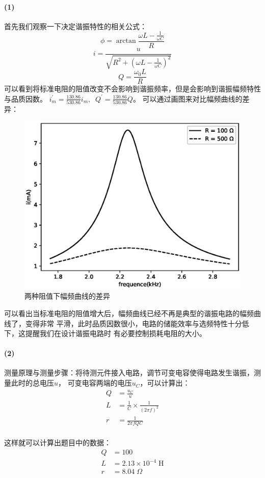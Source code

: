 \documentclass[a4paper]{ctexart}
\begin{document}
    \paragraph{(1)} 
    首先我们观察一下决定谐振特性的相关公式：
    $$
    \phi = \arctan\frac{\omega L - \frac{1}{\omega C}}{R}
    $$
    $$
    i = \frac{u}{\sqrt{R^{2} + \left(\omega L - \frac{1}{\omega C}\right)^{2}}}
    $$
    $$
    Q = \frac{\omega_{0}L}{R}
    $$
    可以看到将标准电阻的阻值改变不会影响到谐振频率，但是会影响到谐振幅频特性与品质因数。
    $i_{m}^{'} = \frac{130.86}{530.86}i_{m},\;\;Q^{'} = \frac{130.86}{530.86}Q$。
    可以通过画图来对比幅频曲线的差异：
    \begin{figure}[htbp]
        \centering
        \includegraphics[scale=0.8]{compare.eps}
        \caption{两种阻值下幅频曲线的差异}
    \end{figure}
    \par 
    可以看出当标准电阻的阻值增大后，幅频曲线已经不再是典型的谐振电路的幅频曲线了，变得非常
    平滑，此时品质因数很小，电路的储能效率与选频特性十分低下，这提醒我们在设计谐振电路时
    有必要控制损耗电阻的大小。
    \paragraph{(2)}
    \par
    测量原理与测量步骤：将待测元件接入电路，调节可变电容使得电路发生谐振，测量此时的总电压$u$，
    可变电容两端的电压$u_{C}$，可以计算出：
    \begin{align*}
        Q &= \frac{u_{C}}{u}\\
        L &= \frac{1}{C} \times \frac{1}{(2\pi f)^{2}}\\
        r &= \frac{1}{2\pi f Q C}\\
    \end{align*}
    \par 
    这样就可以计算出题目中的数据：
    \begin{align*}
        Q &= 100\\
        L &= 2.13 \times 10^{-4}\;\mathrm{H} \\
        r &= 8.04\;\Omega\\
    \end{align*}
    \\
\end{document}
